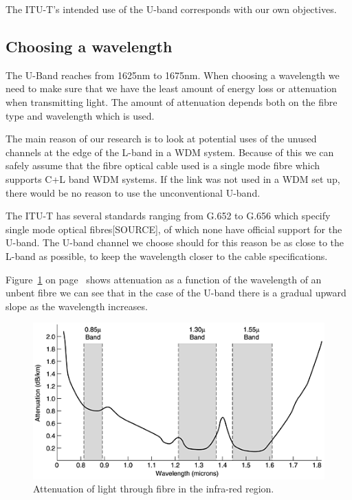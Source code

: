 \documentclass{article}
\begin{document}
The ITU-T's intended use of the U-band corresponds with our own objectives.

\subsection{Choosing a wavelength}
The U-Band reaches from 1625nm to 1675nm. When choosing a wavelength we need to make sure that we have the least amount of energy loss or attenuation when transmitting light.
The amount of attenuation depends both on the fibre type and wavelength which is used. 

The main reason of our research is to look at potential uses of the unused channels at the edge of the L-band in a WDM system.
Because of this we can safely assume that the fibre optical cable used is a single mode fibre which supports C+L band WDM systems.
If the link was not used in a WDM set up, there would be no reason to use the unconventional U-band.

The ITU-T has several standards ranging from G.652 to G.656 which specify single mode optical fibres[SOURCE], of which none have official support for the U-band.
The U-band channel we choose should for this reason be as close to the L-band as possible, to keep the wavelength closer to the cable specifications.

Figure~\ref{fig:attenuation} on page~\pageref{fig:attenuation} shows attenuation as a function of the wavelength of an unbent fibre we can see that in the case of the U-band there is a gradual upward slope as the wavelength increases.
\begin{figure}[h]
\centerline{\includegraphics[scale=0.5, trim = 0mm 0mm 0mm 0mm]{images/attenuation.png}}
\caption{Attenuation of light through fibre in the infra-red region.\cite[fig 2-6]{tannenbaum:networks}}
\label{fig:attenuation}
\end{figure}
\end{document}
